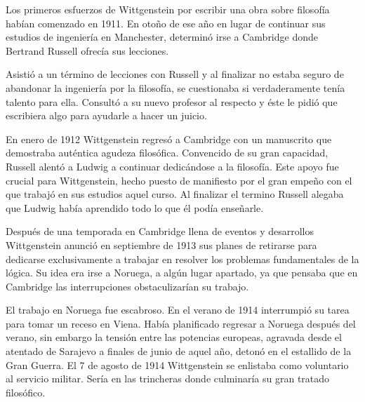 
Los primeros esfuerzos de Wittgenstein por escribir una obra sobre filosofía
habían comenzado en 1911. En otoño de ese año en lugar de continuar sus estudios
de ingeniería en Manchester, determinó irse a Cambridge donde Bertrand Russell
ofrecía sus lecciones.

Asistió a un término de lecciones con Russell y al finalizar no estaba seguro de
abandonar la ingeniería por la filosofía, se cuestionaba si verdaderamente tenía
talento para ella. Consultó a su nuevo profesor al respecto y éste le pidió que
escribiera algo para ayudarle a hacer un juicio.

En enero de 1912 Wittgenstein regresó a Cambridge con un manuscrito que
demostraba auténtica agudeza filosófica. Convencido de su gran capacidad,
Russell alentó a Ludwig a continuar dedicándose a la filosofía. Este apoyo fue
crucial para Wittgenstein, hecho puesto de manifiesto por el gran empeño con el
que trabajó en sus estudios aquel curso. Al finalizar el termino Russell alegaba
que Ludwig había aprendido todo lo que él podía enseñarle.\autocite[cap. 3 loc
865]{monk}

Después de una temporada en Cambridge llena de eventos y desarrollos
Wittgenstein anunció en septiembre de 1913 sus planes de retirarse para
dedicarse exclusivamente a trabajar en resolver los problemas fundamentales de
la lógica. Su idea era irse a Noruega, a algún lugar apartado, ya que pensaba
que en Cambridge las interrupciones obstaculizarían su trabajo.\autocite[cap. 4
loc 1844]{monk}

 El trabajo en Noruega fue escabroso.
En el verano de 1914 interrumpió su tarea para tomar un receso en
Viena.\autocite[cap. 5 loc 2154]{monk} Había planificado regresar a Noruega
después del verano, sin embargo la tensión entre las potencias europeas,
agravada desde el atentado de Sarajevo a finales de junio de aquel año, detonó
en el estallido de la Gran Guerra. El 7 de agosto de 1914 Wittgenstein se
enlistaba como voluntario al servicio militar. Sería en las trincheras donde
culminaría su gran tratado filosófico.

